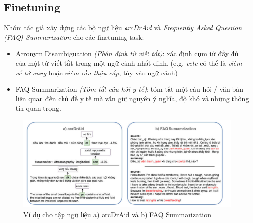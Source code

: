 \subsection{Finetuning}
Nhóm tác giả xây dựng các bộ ngữ liệu \textit{arcDrAid} và \textit{Frequently Asked Question (FAQ) Summarization} cho các finetuning task:
\begin{itemize}
\item Acronym Disambiguation \textit{(Phân định từ viết tắt)}: xác định cụm từ đầy đủ của một từ viết tắt trong một ngữ cảnh nhất định. (e.g. \textit{vctc} có thể là \textit{viêm cổ tử cung} hoặc \textit{viêm cầu thận cấp}, tùy vào ngữ cảnh)
\item FAQ Summarization \textit{(Tóm tắt câu hỏi y tế)}: tóm tắt một câu hỏi / văn bản liên quan đến chủ đề y tế mà vẫn giữ nguyên ý nghĩa, độ khó và những thông tin quan trọng.
\end{itemize}

\begin{figure}
\centering
\includegraphics[scale=.65]{img/finetune-datasets.PNG}
\caption{Ví dụ cho tập ngữ liệu a) arcDrAid và b) FAQ Summarization\cite{minh-EtAl:2022:LREC}}
\label{fig:finetune-datasets}
\end{figure}

